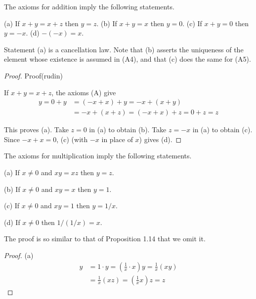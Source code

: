 \begin{Proposition}
The axioms for addition imply the following statements.

(a) If $x+y=x+z$ then $y=z$.
(b) If $x+y=x$ then $y=0$.
(c) If $x+y=0$ then $y= -x$.
(d) $-(-x)=x$.

Statement (a) is a cancellation law. Note that (b) asserts the uniqueness
of the element whose existence is assumed in (A4), and that (c) does the same
for (A5).
\end{Proposition}



\begin{proof}
    Proof(rudin)

If $x + y =x + z$, the axioms (A) give
\begin{align*}
    y =0+y&=(-x+x)+y=-x+(x+y)\\
    &=-x+(x+z)=(-x+x)+z=0+z=z
\end{align*}

This proves (a). Take $z = 0$ in (a) to obtain (b). Take $z= -x$ in (a) to
obtain (c).
Since $-x + x = 0$, (c) (with $-x$ in place of $x$) gives (d).
\end{proof}


\begin{Proposition}
The axioms for multiplication imply the following statements.

(a) If $x\neq0$ and $xy=xz$ then $y=z$.

(b) If $x\neq0$ and $xy=x$ then $y=1$.

(c) If $x\neq0$ and $xy=1$ then $y=1/x$.

(d) If $x\neq0$ then $1/(1/x) = x$.
\end{Proposition}

The proof is so similar to that of Proposition 1.14 that we omit it.


    \begin{proof}
(a) 
\begin{align*}
    y&=1\cdot y=\left(\frac{1}{x}\cdot x\right)y =\frac{1}{x}\left( xy \right)\\
    &=\frac{1}{x}(xz) =\left(\frac{1}{x}x\right)z = z
\end{align*}

    \end{proof}